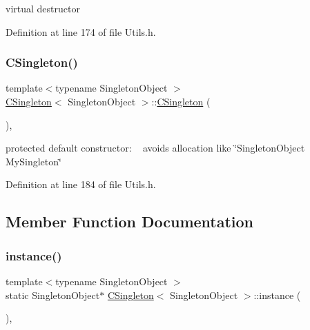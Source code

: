 virtual destructor 



Definition at line 174 of file Utils.\+h.

\mbox{\label{classCSingleton_aa03a7284f8092927696c3a94ef87cf31}} 
\subsubsection{\texorpdfstring{C\+Singleton()}{CSingleton()}}
{\footnotesize\ttfamily template$<$typename Singleton\+Object $>$ \\
\hyperlink{classCSingleton}{C\+Singleton}$<$ Singleton\+Object $>$\+::\hyperlink{classCSingleton}{C\+Singleton} (\begin{DoxyParamCaption}{ }\end{DoxyParamCaption})\hspace{0.3cm}{\ttfamily [inline]}, {\ttfamily [protected]}}



protected default constructor\+: ~\newline
 avoids allocation like \char`\"{}\+Singleton\+Object My\+Singleton\char`\"{} 



Definition at line 184 of file Utils.\+h.



\subsection{Member Function Documentation}
\mbox{\label{classCSingleton_a58f5ac3aaaea8079a373350594726bdf}} 
\subsubsection{\texorpdfstring{instance()}{instance()}}
{\footnotesize\ttfamily template$<$typename Singleton\+Object $>$ \\
static Singleton\+Object$\ast$ \hyperlink{classCSingleton}{C\+Singleton}$<$ Singleton\+Object $>$\+::instance (\begin{DoxyParamCaption}{ }\end{DoxyParamCaption})\hspace{0.3cm}{\ttfamily [inline]}, {\ttfamily [static]}}



